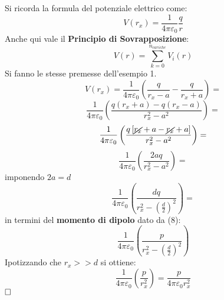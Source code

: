 Si ricorda la formula del potenziale elettrico come:
$$
  V(r_x) = \frac{1}{4 \pi \varepsilon_0}\frac{q}{r}
$$ 
Anche qui vale il \textbf{Principio di Sovrapposizione}:
$$
  V(r) = \sum_{k = 0}^{n_{cariche}}{V_i(r)}
$$
Si fanno le stesse premesse dell'esempio 1.\\
$$ V(r_x) = \frac{1}{4 \pi \varepsilon_0} \left(\frac{q}{r_x - a} - \frac{q}{r_x + a}\right) =
$$
$$
\frac{1}{4 \pi \varepsilon_0} \left(\frac{q(r_x + a) - q(r_x - a)}{r_x^2 - a^2}\right) = 
$$
$$
\frac{ 1 }{ 4 \pi \varepsilon_0 } \left( \frac{ q \left[ \cancel{ r_x } + a - \cancel{ r_x } + a \right] }{ r_x^2 - a^2 } \right) =
$$
$$
\frac{1}{4 \pi \varepsilon_0} \left(\frac{2aq}{r_x^2 - a^2}\right) =
$$
imponendo $2a = d$
$$
\frac{ 1 }{ 4 \pi \varepsilon_0 } 
\left( 
    \frac{ dq }{ r_x^2 - 
	\left( 
        \frac{ d }{ 2 } 
    \right) ^2 
    } 
\right) =
$$
in termini del \textbf{momento di dipolo} dato da (8):
$$
\frac{1}{4 \pi \varepsilon_0} \left(\frac{p}{r_x^2 - \left(\frac{d}{2}\right)^2}\right)
$$
Ipotizzando che $r_x >> d$ si ottiene:
$$
\frac{1}{4 \pi \varepsilon_0} \left(\frac{p}{r_x^2}\right) = \frac{ p }{ 4 \pi \varepsilon_0 r_x^2}
$$
$\hfill\square$ \\
